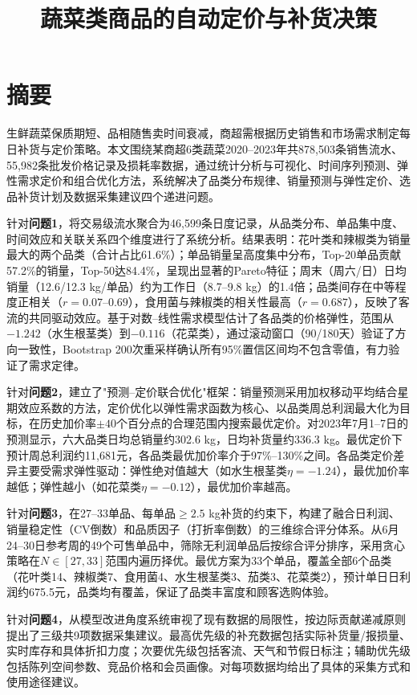 \documentclass[12pt,a4paper]{ctexart}
\title{\vspace{-2.5cm}\textbf{蔬菜类商品的自动定价与补货决策}}
\author{\vspace{-1cm}}
\date{}
\begin{document}
\maketitle
\thispagestyle{empty}

\section*{摘\quad 要}
\thispagestyle{fancy}

生鲜蔬菜保质期短、品相随售卖时间衰减，商超需根据历史销售和市场需求制定每日补货与定价策略。本文围绕某商超6类蔬菜2020--2023年共878,503条销售流水、55,982条批发价格记录及损耗率数据，通过统计分析与可视化、时间序列预测、弹性需求定价和组合优化方法，系统解决了品类分布规律、销量预测与弹性定价、选品补货计划及数据采集建议四个递进问题。

针对\textbf{问题1}，将交易级流水聚合为46,599条日度记录，从品类分布、单品集中度、时间效应和关联关系四个维度进行了系统分析。结果表明：花叶类和辣椒类为销量最大的两个品类（合计占比61.6\%）；单品销量呈高度集中分布，Top-20单品贡献57.2\%的销量，Top-50达84.4\%，呈现出显著的Pareto特征；周末（周六/日）日均销量（12.6/12.3 kg/单品）约为工作日（8.7--9.8 kg）的1.4倍；品类间存在中等程度正相关（$r=0.07$--$0.69$），食用菌与辣椒类的相关性最高（$r=0.687$），反映了客流的共同驱动效应。基于对数--线性需求模型估计了各品类的价格弹性，范围从$-1.242$（水生根茎类）到$-0.116$（花菜类），通过滚动窗口（90/180天）验证了方向一致性，Bootstrap 200次重采样确认所有95\%置信区间均不包含零值，有力验证了需求定律。

针对\textbf{问题2}，建立了"预测--定价联合优化"框架：销量预测采用加权移动平均结合星期效应系数的方法，定价优化以弹性需求函数为核心、以品类周总利润最大化为目标，在历史加价率$\pm 40$个百分点的合理范围内搜索最优定价。对2023年7月1--7日的预测显示，六大品类日均总销量约302.6 kg，日均补货量约336.3 kg。最优定价下预计周总利润约11,681元，各品类最优加价率介于97\%--130\%之间。各品类定价差异主要受需求弹性驱动：弹性绝对值越大（如水生根茎类$\eta=-1.24$），最优加价率越低；弹性越小（如花菜类$\eta=-0.12$），最优加价率越高。

针对\textbf{问题3}，在27--33单品、每单品$\ge 2.5$ kg补货的约束下，构建了融合日利润、销量稳定性（CV倒数）和品质因子（打折率倒数）的三维综合评分体系。从6月24--30日参考周的49个可售单品中，筛除无利润单品后按综合评分排序，采用贪心策略在$N\in[27,33]$范围内遍历择优。最优方案为33个单品，覆盖全部6个品类（花叶类14、辣椒类7、食用菌4、水生根茎类3、茄类3、花菜类2），预计单日日利润约675.5元，品类均有覆盖，保证了品类丰富度和顾客选购体验。

针对\textbf{问题4}，从模型改进角度系统审视了现有数据的局限性，按边际贡献递减原则提出了三级共9项数据采集建议。最高优先级的补充数据包括实际补货量/报损量、实时库存和具体折扣力度；次要优先级包括客流、天气和节假日标注；辅助优先级包括陈列空间参数、竞品价格和会员画像。对每项数据均给出了具体的采集方式和使用途径建议。
\end{document}
